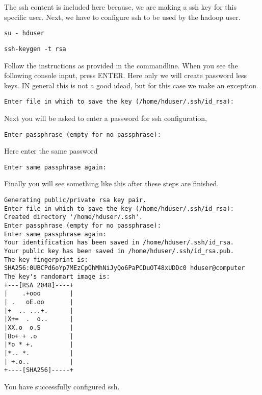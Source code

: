 The ssh content is included here because, we are making a
ssh key for this specific user. 
Next, we have to configure ssh to be used by the hadoop user.

\begin{lstlisting}
su - hduser
\end{lstlisting}

\begin{lstlisting}
ssh-keygen -t rsa
\end{lstlisting}

Follow the instructions as provided in the commandline.
When you see the following console input, press ENTER. Here only we
will create password less keys. IN general this is not a good idead,
but for this case we make an exception.

\begin{lstlisting}
Enter file in which to save the key (/home/hduser/.ssh/id_rsa):
\end{lstlisting}

Next you will be asked to enter a password for ssh configuration,

\begin{lstlisting}
Enter passphrase (empty for no passphrase):
\end{lstlisting}

Here enter the same password

\begin{lstlisting}
Enter same passphrase again:
\end{lstlisting}

Finally you will see something like this after these steps are finished.

\begin{lstlisting}
Generating public/private rsa key pair.
Enter file in which to save the key (/home/hduser/.ssh/id_rsa):
Created directory '/home/hduser/.ssh'.
Enter passphrase (empty for no passphrase):
Enter same passphrase again:
Your identification has been saved in /home/hduser/.ssh/id_rsa.
Your public key has been saved in /home/hduser/.ssh/id_rsa.pub.
The key fingerprint is:
SHA256:0UBCPd6oYp7MEzCpOhMhNiJyQo6PaPCDuOT48xUDDc0 hduser@computer
The key's randomart image is:
+---[RSA 2048]----+
|    .+ooo        |
| .   oE.oo       |
|+  .. ...+.      |
|X+=  .  o..      |
|XX.o  o.S        |
|Bo+ + .o         |
|*o * +.          |
|*.. *.           |
| +.o..           |
+----[SHA256]-----+
\end{lstlisting}

You have successfully configured ssh.

